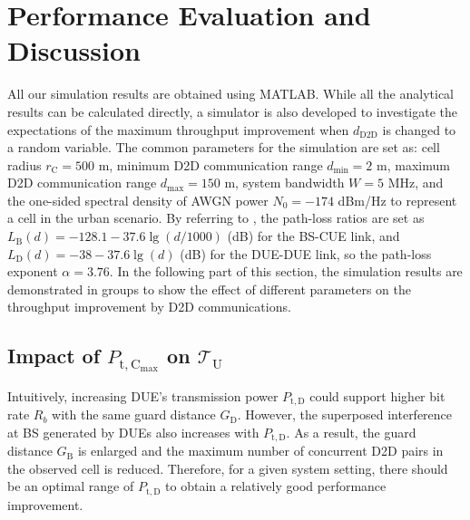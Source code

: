 \documentclass[journal, 10pt]{IEEEtran}
\begin{document}
\section{Performance Evaluation and Discussion}\label{sec:eval}

All our simulation results are obtained using MATLAB. While all the
analytical results can be calculated directly, a simulator is also
developed to investigate the expectations of the maximum throughput
improvement when $d_\mathrm{D2D}$ is changed to a random variable. The
common parameters for the simulation are set as: cell radius
$r_\mathrm{C} = 500$ m, minimum D2D communication range $d_{\min} = 2$
m, maximum D2D communication range $d_{\max} = 150$ m, system
bandwidth $W = 5$ MHz, and the one-sided spectral density of AWGN
power $N_0 = -174$ dBm/Hz to represent a cell in the urban scenario.
By referring to \cite{3GPP}, the path-loss ratios are set as
$L_\mathrm{B}(d) =-128.1- 37.6\lg(d/1000)$ (dB) for the BS-CUE link,
and $L_\mathrm{D}(d) =-38-37.6 \lg(d)$ (dB) for the DUE-DUE link, so
the path-loss exponent $\alpha=3.76$. In the following part of this
section, the simulation results are demonstrated in groups to show the
effect of different parameters on the throughput improvement by D2D
communications.


\subsection{Impact of $P_\mathrm{t, C_{max}}$ on 
$\mathcal{T}_\mathrm{U}$}\label{sec:Simu-1}

Intuitively, increasing DUE's transmission power $P_\mathrm{t, D}$
could support higher bit rate $R_b$ with the same guard distance
$G_\mathrm{D}$. However, the superposed interference at BS generated
by DUEs also increases with $P_\mathrm{t, D}$. As a result, the guard
distance $G_\mathrm{B}$ is enlarged and the maximum number of
concurrent D2D pairs in the observed cell is reduced. Therefore, for a
given system setting, there should be an optimal range of
$P_\mathrm{t, D}$ to obtain a relatively good performance improvement.
\end{document}
